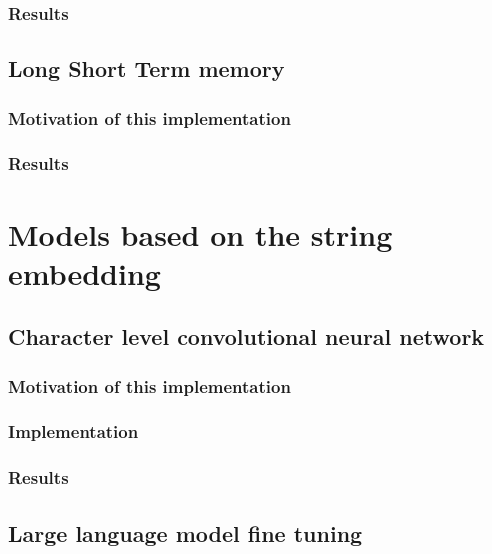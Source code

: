 \documentclass{article}
\begin{document}
    \subsubsection{Results}

    \subsection{Long Short Term memory}\label{subsec:long-short-term-memory}

    \subsubsection{Motivation of this implementation}

    \subsubsection{Results}


    \section{Models based on the string embedding}\label{sec:models-based-on-the-string-embedding}

    \subsection{Character level convolutional neural network}\label{subsec:character-level-convolutional-neural-network}

    \subsubsection{Motivation of this implementation}

    \subsubsection{Implementation}

    \subsubsection{Results}

    \subsection{Large language model fine tuning}\label{subsec:large-language-model-finetuning}
\end{document}
